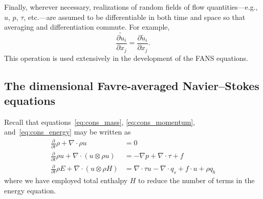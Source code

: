\documentclass[letterpaper,11pt,nointlimits,reqno]{amsart}
\newcommand{\pp}[2]{\frac{\partial #1}{\partial #2}}
\begin{document}
Finally, wherever necessary, realizations of random fields of flow
quantities---e.g., $u$, $p$, $\tau$, etc.---are assumed to be differentiable in
both time and space so that averaging and differentiation commute.  For
example,
%
\begin{equation*}
\widetilde{ \pp{u_i}{x_j} } = \pp{\tilde{u}_i}{x_j}.
\end{equation*}
%
This operation is used extensively in the development of the FANS equations.

\subsection{The dimensional Favre-averaged Navier--Stokes equations}

Recall that equations~\eqref{eq:cons_mass}, \eqref{eq:cons_momentum},
and~\eqref{eq:cons_energy} may be written as
\begin{align}
  \frac{\partial}{\partial{}t}\rho+\nabla\cdot\rho{}u &= 0
\\
  \frac{\partial{}}{\partial{}t}\rho{}u + \nabla\cdot(u\otimes{}\rho{}u)
  &= -\nabla{}p + \nabla\cdot{}\tau + f
\\
  \frac{\partial}{\partial{}t} \rho{}E
  +
  \nabla\cdot{}(u\otimes{}\rho{}H)
&=
    \nabla\cdot{}\tau{}u
  - \nabla\cdot{}q_{s}
  + f\cdot{}u
  + \rho{}q_b
\end{align}
where we have employed total enthalpy $H$ to reduce the number of terms in the
energy equation.
\end{document}
